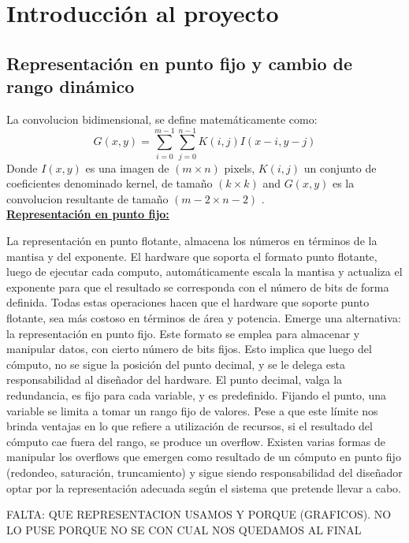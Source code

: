 \documentclass[a4paper]{article}
\begin{document}
\section{Introducción al proyecto} \label{intro}
\subsection{Representación en punto fijo y cambio de rango dinámico }\label{fixedpoint}
La convolucion bidimensional, se define matemáticamente como:
\begin{equation}\label{conv-org}
  G(x,y) = \sum_{i=0}^{m-1} \sum_{j=0}^{n-1}K(i,j)I(x-i,y-j)
\end{equation}
Donde $I(x,y)$ es una imagen de $(m \times n)$ pixels, $K(i,j)$ un conjunto de coeficientes denominado kernel, de tamaño
$(k \times k)$ and $G(x,y)$ es la convolucion resultante de tamaño  $(m-2 \times n-2)$ .\\

\underline{\textbf{Representación en punto fijo:}}

La representación en punto flotante, almacena los números en términos de la mantisa y del exponente. El hardware que soporta el formato punto flotante, luego de ejecutar cada computo, 
automáticamente escala la mantisa y actualiza el exponente para que el resultado se corresponda con el número de bits de forma definida. Todas estas operaciones hacen que el hardware que soporte punto flotante,
sea más costoso en términos de área y potencia. Emerge una alternativa: la representación en punto fijo.
Este formato se emplea para almacenar y manipular datos, con cierto número de bits fijos. Esto implica que luego del cómputo, no se sigue la posición del punto decimal, y
se le delega esta responsabilidad al diseñador del hardware. El punto decimal, valga la redundancia, es fijo para cada variable, y es predefinido.
Fijando el punto, una variable se limita a tomar un rango fijo de valores.
Pese a que este límite nos brinda ventajas en lo que refiere a utilización de recursos, si el resultado del cómputo cae fuera del rango, se produce un overflow. Existen varias
formas de manipular los overflows que emergen como resultado de un cómputo en punto fijo (redondeo, saturación, truncamiento) y sigue siendo responsabilidad del diseñador optar por
la representación adecuada según el sistema que pretende llevar a cabo.

FALTA:    QUE REPRESENTACION USAMOS Y  PORQUE (GRAFICOS). NO LO PUSE PORQUE NO SE CON CUAL NOS QUEDAMOS AL FINAL
\end{document}
